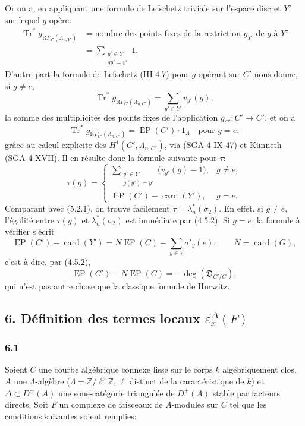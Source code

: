 \documentclass[11pt]{article}
\newcommand{\R}{\mathrm{R}}\newcommand{\RHomCore}{\mathrm{RHom}}
\providecommand{\Tr}{\operatorname{Tr}}
\providecommand{\EP}{\operatorname{EP}}
\providecommand{\Tr}{\operatorname{Tr}}
\providecommand{\Tr}{\operatorname{Tr}}
\providecommand{\R}{\mathrm R}
\providecommand{\Tr}{\operatorname{Tr}}
\providecommand{\EP}{\operatorname{EP}}
\providecommand{\RG}{\R\Gamma}
\providecommand{\Tr}{\operatorname{Tr}}
\begin{document}
Or on a, en appliquant une formule de Lefschetz triviale sur l'espace discret $Y'$ sur lequel $g$ opère:
\[
\begin{aligned}
\Tr^*g_{\RG_{Y'}(\Lambda_{n,Y'})}
&=\text{nombre des points fixes de la restriction } g_{Y'} \text{ de } g \text{ à } Y'\\
&=\sum_{\substack{y'\in Y'\\gy'=y'}}1.
\end{aligned}
\]
D'autre part la formule de Lefschetz (III 4.7) pour $g$ opérant sur $C'$ nous donne, si $g\ne e$,
\[
\Tr^*g_{\RG_{C'}(\Lambda_{n,C'})}
=
\sum_{y'\in Y'} v_{y'}(g),
\]
la somme des multiplicités des points fixes de l'application $g_{C'}:C'\to C'$, et on a
\[
\Tr^*g_{\RG_{C'}(\Lambda_{n,C'})}=\EP(C')\cdot1_\Lambda
\quad\text{pour }g=e,
\]
grâce au calcul explicite des $H^1(C',\Lambda_{n,C'})$, via (SGA 4 IX 47) et Künneth (SGA 4 XVII). Il en résulte donc la formule suivante pour $\tau$:
\[
\tau(g)=
\begin{cases}
\displaystyle\sum_{\substack{y'\in Y'\\g(y')=y'}}\bigl(v_{y'}(g)-1\bigr),& g\ne e,\\[0.8em]
\EP(C')-\operatorname{card}(Y'),& g=e.
\end{cases}
\tag{5.2.2}
\]
Comparant avec (5.2.1), on trouve facilement $\tau=\lambda_n^*(\sigma_2)$. En effet, si $g\ne e$, l'égalité entre $\tau(g)$ et $\lambda_n^*(\sigma_2)$ est immédiate par (4.5.2). Si $g=e$, la formule à vérifier s'écrit
\[
\EP(C')-\operatorname{card}(Y')
=
N\EP(C)-\sum_{y\in Y}\sigma'_y(e),
\qquad N=\operatorname{card}(G),
\]
c'est-à-dire, par (4.5.2),
\[
\EP(C')-N\EP(C)=-\deg(\mathfrak D_{C'/C}),
\]
qui n'est pas autre chose que la classique formule de Hurwitz.

\subsection*{6. Définition des termes locaux $\varepsilon_x^\Delta(F)$}

\subsubsection*{6.1}

Soient $C$ une courbe algébrique connexe lisse sur le corps $k$ algébriquement clos, $A$ une $\Lambda$-algèbre ($\Lambda=\mathbb Z/\ell^\nu\mathbb Z$, $\ell$ distinct de la caractéristique de $k$) et $\Delta\subset D^+(A)$ une sous-catégorie triangulée de $D^+(A)$ stable par facteurs directs. Soit $F$ un complexe de faisceaux de $A$-modules sur $C$ tel que les conditions suivantes soient remplies:
\end{document}
